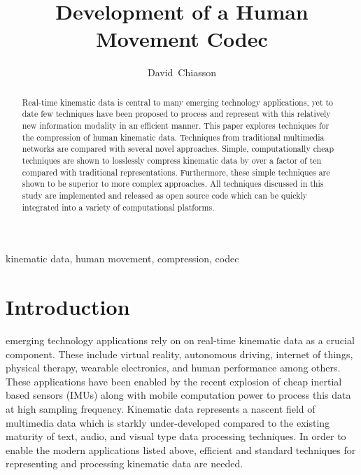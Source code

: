 \documentclass[journal]{IEEEtran}
\begin{document}
\title{Development of a Human Movement Codec}


\author{David~Chiasson}

\maketitle

\begin{abstract}
Real-time kinematic data is central to many emerging technology applications, yet to date few techniques have been proposed to process and represent with this relatively new information modality in an efficient manner. This paper explores techniques for the compression of human kinematic data. Techniques from traditional multimedia networks are compared with several novel approaches. Simple, computationally cheap techniques are shown to losslessly compress kinematic data by over a factor of ten compared with traditional representations. Furthermore, these simple techniques are shown to be superior to more complex approaches.
All techniques discussed in this study are implemented and released as open source code which can be quickly integrated into a variety of computational platforms. 
\end{abstract}

\begin{IEEEkeywords}
kinematic data, human movement, compression, codec
\end{IEEEkeywords}



\section{Introduction}

 emerging technology applications rely on on real-time kinematic data as a crucial component. These include virtual reality, autonomous driving, internet of things, physical therapy, wearable electronics, and human performance among others. These applications have been enabled by the recent explosion of cheap inertial based sensors (IMUs) along with mobile computation power to process this data at high sampling frequency. Kinematic data represents a nascent field of multimedia data which is starkly under-developed compared to the existing maturity of text, audio, and visual type data processing techniques. In order to enable the modern applications listed above, efficient and standard techniques for representing and processing kinematic data are needed.
\end{document}
